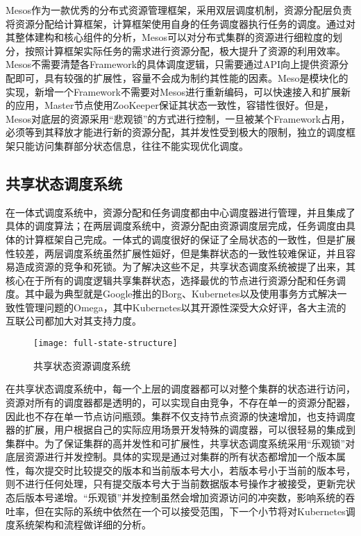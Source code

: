 Mesos作为一款优秀的分布式资源管理框架，采用双层调度机制，资源分配层负责将资源分配给计算框架，计算框架使用自身的任务调度器执行任务的调度。通过对其整体建构和核心组件的分析，Mesos可以对分布式集群的资源进行细粒度的划分，按照计算框架实际任务的需求进行资源分配，极大提升了资源的利用效率。Mesos不需要清楚各Framework的具体调度逻辑，只需要通过API向上提供资源分配即可，具有较强的扩展性，容量不会成为制约其性能的因素。Meso是模块化的实现，新增一个Framework不需要对Mesos进行重新编码，可以快速接入和扩展新的应用，Master节点使用ZooKeeper保证其状态一致性，容错性很好。但是，Mesos对底层的资源采用“悲观锁”的方式进行控制，一旦被某个Framework占用，必须等到其释放才能进行新的资源分配，其并发性受到极大的限制，独立的调度框架只能访问集群部分状态信息，往往不能实现优化调度。
\subsection{共享状态调度系统}
在一体式调度系统中，资源分配和任务调度都由中心调度器进行管理，并且集成了具体的调度算法；在两层调度系统中，资源分配由资源调度层完成，任务调度由具体的计算框架自己完成。一体式的调度很好的保证了全局状态的一致性，但是扩展性较差，两层调度系统虽然扩展性姮好，但是集群状态的一致性较难保证，并且容易造成资源的竞争和死锁。为了解决这些不足，共享状态调度系统被提了出来，其核心在于所有的调度逻辑共享集群状态，选择最优的节点进行资源分配和任务调度。其中最为典型就是Google推出的Borg、Kubernetes以及使用事务方式解决一致性管理问题的Omega，其中Kubernetes以其开源性深受大众好评，各大主流的互联公司都加大对其支持力度。

\begin{figure}[H] %
	\centering
	\texttt{[image: full-state-structure]}
	\caption{共享状态资源调度系统}
	\label{fig:xfig1}
\end{figure}
在共享状态调度系统中，每一个上层的调度器都可以对整个集群的状态进行访问，资源对所有的调度器都是透明的，可以实现自由竞争，不存在单一的资源分配器，因此也不存在单一节点访问瓶颈。集群不仅支持节点资源的快速增加，也支持调度器的扩展，用户根据自己的实际应用场景开发特殊的调度器，可以很轻易的集成到集群中。为了保证集群的高并发性和可扩展性，共享状态调度系统采用“乐观锁”对底层资源进行并发控制。具体的实现是通过对集群的所有状态都增加一个版本属性，每次提交时比较提交的版本和当前版本号大小，若版本号小于当前的版本号，则不进行任何处理，只有提交版本号大于当前数据版本号操作才被接受，更新完状态后版本号递增。“乐观锁”并发控制虽然会增加资源访问的冲突数，影响系统的吞吐率，但在实际的系统中依然在一个可以接受范围，下一个小节将对Kubernetes调度系统架构和流程做详细的分析。


